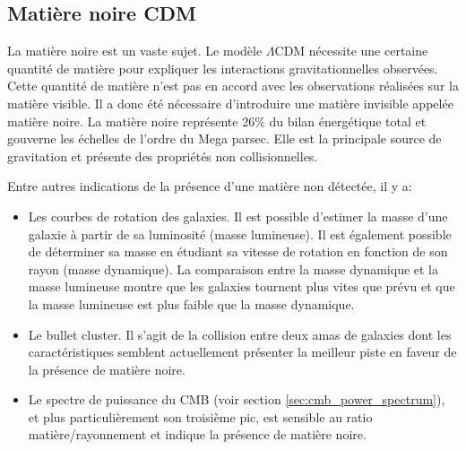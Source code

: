 \subsection{Matière noire CDM}

La matière noire est un vaste sujet.
Le modèle $\Lambda$CDM nécessite une certaine quantité de matière pour expliquer les interactions gravitationnelles observées.
Cette quantité de matière n'est pas en accord avec les observations réalisées sur la matière visible.
Il a donc été nécessaire d’introduire une matière invisible appelée matière noire.
La matière noire représente 26\% du bilan énergétique total et gouverne les échelles de l'ordre du Mega parsec.
Elle est la principale source de gravitation et présente des propriétés non collisionnelles.

Entre autres indications de la présence d'une matière non détectée, il y a:
\begin{itemize}

\item Les courbes de rotation des galaxies.
Il est possible d’estimer la masse d'une galaxie à partir de sa luminosité (masse lumineuse).
Il est également possible de déterminer sa masse en étudiant sa vitesse de rotation en fonction de son rayon (masse dynamique).
La comparaison entre la masse dynamique et la masse lumineuse montre que les galaxies tournent plus vites que prévu et que la masse lumineuse est plus faible que la masse dynamique.

\item Le bullet cluster.
Il s'agit de la collision entre deux amas de galaxies dont les caractéristiques semblent actuellement présenter la meilleur piste en faveur de la présence de matière noire.

\item Le spectre de puissance du \ac{CMB} (voir section \ref{sec:cmb_power_spectrum}), et plus particulièrement son troisième pic, est sensible au ratio matière/rayonnement et indique la présence de matière noire.

\end{itemize}





